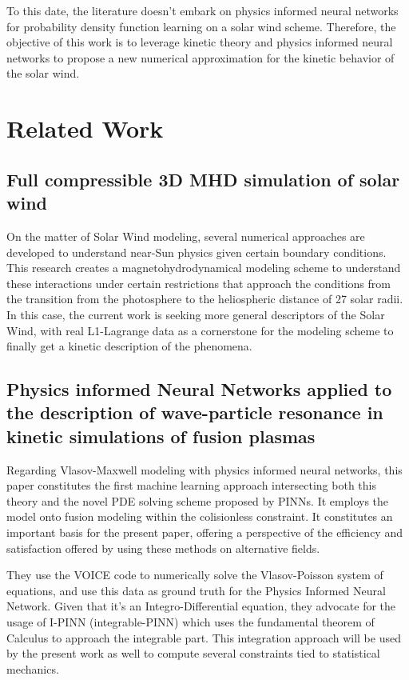 \documentclass[12pt]{article}
\begin{document}
To this date, the literature doesn't embark on physics informed neural networks for probability density function learning on a solar wind scheme. Therefore, the objective of this work is to leverage kinetic theory and physics informed neural networks to propose a new numerical approximation for the kinetic behavior of the solar wind.

\section{Related Work}

\subsection{Full compressible 3D MHD simulation of solar wind}
On the matter of Solar Wind modeling, several numerical approaches are developed to understand near-Sun physics given certain boundary conditions. This research \cite{windmodelling1} creates a magnetohydrodynamical modeling scheme to understand these interactions under certain restrictions that approach the conditions from the transition from the photosphere to the heliospheric distance of 27 solar radii. In this case, the current work is seeking more general descriptors of the Solar Wind, with real L1-Lagrange data as a cornerstone for the modeling scheme to finally get a kinetic description of the phenomena.

\subsection{Physics informed Neural Networks applied to the description of wave-particle resonance in kinetic simulations of fusion plasmas}

Regarding Vlasov-Maxwell modeling with physics informed neural networks, this paper constitutes the first machine learning approach intersecting both this theory and the novel PDE solving scheme proposed by PINNs. \cite{kumar2023physicsinformedneuralnetworks} It employs the model onto fusion modeling within the colisionless constraint. It constitutes an important basis for the present paper, offering a perspective of the efficiency and satisfaction offered by using these methods on alternative fields.

They use the VOICE code to numerically solve the Vlasov-Poisson system of equations, and use this data as ground truth for the Physics Informed Neural Network. Given that it's an Integro-Differential equation, they advocate for the usage of I-PINN (integrable-PINN) \cite{} which uses the fundamental theorem of Calculus to approach the integrable part. This integration approach will be used by the present work as well to compute several constraints tied to statistical mechanics.
\end{document}
